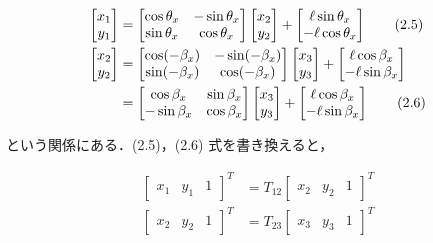 \begin{align}
    \begin{bmatrix}
    x_1 \\ y_1
    \end{bmatrix}
    &=
    \begin{bmatrix}
    \cos\theta_x & -\sin\theta_x \\
    \sin\theta_x & \cos\theta_x
    \end{bmatrix}
    \begin{bmatrix}
    x_2 \\ y_2
    \end{bmatrix}
    +
    \begin{bmatrix}
    \ell \sin\theta_x \\ -\ell \cos\theta_x
    \end{bmatrix}
    \tag{2.5} \\
    \begin{bmatrix}
    x_2 \\ y_2
    \end{bmatrix}
    &=
    \begin{bmatrix}
    \cos(-\beta_x) & -\sin(-\beta_x) \\
    \sin(-\beta_x) & \cos(-\beta_x)
    \end{bmatrix}
    \begin{bmatrix}
    x_3 \\ y_3
    \end{bmatrix}
    +
    \begin{bmatrix}
    \ell \cos\beta_x \\ -\ell \sin\beta_x
    \end{bmatrix} \notag \\
    &=
    \begin{bmatrix}
    \cos\beta_x & \sin\beta_x \\
    -\sin\beta_x & \cos\beta_x
    \end{bmatrix}
    \begin{bmatrix}
    x_3 \\ y_3
    \end{bmatrix}
    +
    \begin{bmatrix}
    \ell \cos\beta_x \\ -\ell \sin\beta_x
    \end{bmatrix}
    \tag{2.6}
    \end{align}
    

という関係にある．(2.5)，(2.6) 式を書き換えると，

\begin{align}
    \begin{bmatrix}
    x_1 & y_1 & 1
    \end{bmatrix}^T
    &= T_{12}
    \begin{bmatrix}
    x_2 & y_2 & 1
    \end{bmatrix}^T
    \tag{2.7} \\
    \begin{bmatrix}
    x_2 & y_2 & 1
    \end{bmatrix}^T
    &= T_{23}
    \begin{bmatrix}
    x_3 & y_3 & 1
    \end{bmatrix}^T
    \tag{2.8}
    \end{align}
    
